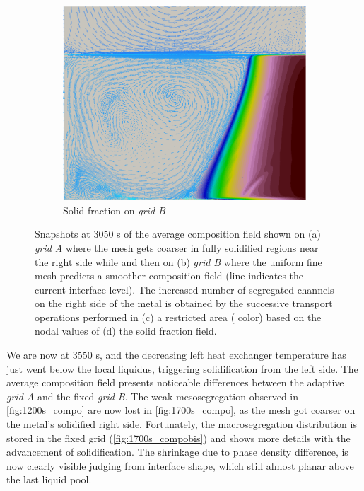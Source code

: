 \begin{figure}[htbp]
\begin{subfigure}[t]{0.4\textwidth}
  \includegraphics[width=\textwidth]{Chapter5/Graphics/2d/1200s_gs_vl.png}
  \caption{Solid fraction on \emph{grid B}}
    \label{fig:1200s_gs}
  \end{subfigure}
\caption{Snapshots at 3050 s of the average composition field shown on (a) \emph{grid A} where the mesh gets coarser in fully solidified regions near the right side while
and then on (b) \emph{grid B} where the uniform fine mesh predicts a smoother composition field (line indicates the current interface level). 
The increased number of segregated channels on the right side of the
metal is obtained by the successive transport operations performed in (c) a restricted area ( color) based on the nodal values of (d) the solid fraction field.}
\label{fig:W_mask_1200s}
\end{figure}


We are now at 3550 s, and the decreasing left heat exchanger temperature has just went below the local liquidus, 
triggering solidification from the left side.
The average composition field presents noticeable differences between the adaptive \emph{grid A} and the fixed \emph{grid B}.
The weak mesosegregation observed in \cref{fig:1200s_compo} are now lost in \cref{fig:1700s_compo}, as the mesh got coarser on the metal's solidified right
side. Fortunately, the macrosegregation distribution is stored in the fixed grid (\cref{fig:1700s_compobis}) and shows more details with the advancement of solidification. 
The shrinkage due to phase density difference, is now clearly visible judging from interface shape, which still almost planar above the last liquid pool. 

